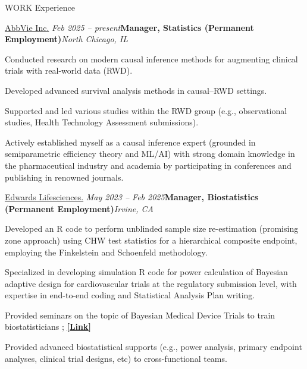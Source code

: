 \documentclass[
	11pt, %
]{resume} %
\begin{document}
\begin{rSection}{WORK Experience}

\begin{rSubsection}{
		\href{https://www.abbvie.com//}{AbbVie Inc.}
	}{\em Feb 2025 -- present}{\textbf{Manager, Statistics (Permanent Employment)}}{\em North Chicago, IL}
	\item Conducted research on modern causal inference methods for augmenting clinical trials with real-world data (RWD).
	\item Developed advanced survival analysis methods in causal–RWD settings.
	\item Supported and led various studies within the RWD group (e.g., observational studies, Health Technology Assessment submissions).
	\item Actively established myself as a causal inference expert (grounded in semiparametric efficiency theory and ML/AI) with strong domain knowledge in the pharmaceutical industry and academia by participating in conferences and publishing in renowned journals.
\end{rSubsection}


\begin{rSubsection}{
\href{https://www.edwards.com/}{Edwards Lifesciences.}
}{\em May 2023 -- Feb 2025}{\textbf{Manager, Biostatistics (Permanent Employment)}}{\em Irvine, CA}
\item Developed an R code to perform unblinded sample size re-estimation (promising zone approach) using CHW test statistics for a hierarchical composite endpoint, employing the Finkelstein and Schoenfeld methodology.
\item Specialized in developing simulation R code for power calculation of Bayesian adaptive design for cardiovascular trials at the regulatory submission level, with expertise in end-to-end coding and Statistical Analysis Plan writing.
\item Provided seminars on the topic of Bayesian Medical Device Trials to train biostatisticians ; \href{https://drive.google.com/file/d/1pHxwp4T9Nq2EKNrlxqzy1VxmxcZAERH-/view}{\underline{\textbf{[Link]}}}
\item Provided advanced biostatistical supports (e.g., power analysis, primary endpoint analyses, clinical trial designs, etc) to cross-functional teams.
\end{rSubsection}



\end{rSection}
\end{document}
